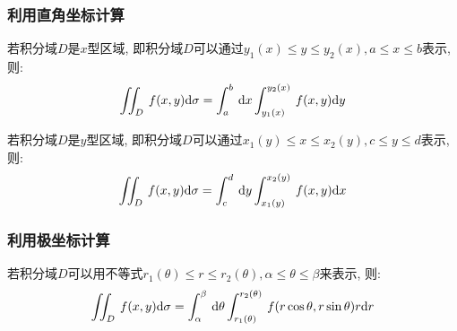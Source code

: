 \subsubsection{利用直角坐标计算}
\par \vspace{.5em}
若积分域$ D $是$ x $型区域, 即积分域$ D $可以通过$ y_{1}(x)\le y\le y_{2}(x), a\le x\le b $表示, 则:
\begin{equation*}
    \displaystyle\iint_{D}^{}\hspace{.2em}f(x,y)\mathrm{d}\sigma=\displaystyle\int_{a}^{b}\hspace{.2em}\mathrm{d}x\displaystyle\int_{y_{1}(x)}^{y_{2}(x)}\hspace{.2em}f(x,y)\mathrm{d}y
\end{equation*}\par
{}\par \vspace{.5em}
若积分域$ D $是$ y $型区域, 即积分域$ D $可以通过$ x_{1}(y)\le x\le x_{2}(y), c\le y\le d $表示, 则:
\begin{equation*}
    \displaystyle\iint_{D}^{}\hspace{.2em}f(x,y)\mathrm{d}\sigma=\displaystyle\int_{c}^{d}\hspace{.2em}\mathrm{d}y\displaystyle\int_{x_{1}(y)}^{x_{2}(y)}\hspace{.2em}f(x,y)\mathrm{d}x
\end{equation*}
\subsubsection{利用极坐标计算}
\par \vspace{.5em}
若积分域$ D $可以用不等式$ r_{1}(\theta)\le r\le r_{2}(\theta), \alpha\le \theta\le \beta $来表示, 则:
\begin{equation*}
    \displaystyle\iint_{D}^{}\hspace{.2em}f(x,y)\mathrm{d}\sigma=\displaystyle\int_{\alpha}^{\beta}\hspace{.2em}\mathrm{d}\theta\displaystyle\int_{r_{1}(\theta)}^{r_{2}(\theta)}\hspace{.2em}f(r\cos \theta, r\sin\theta)r \mathrm{d}r
\end{equation*}
